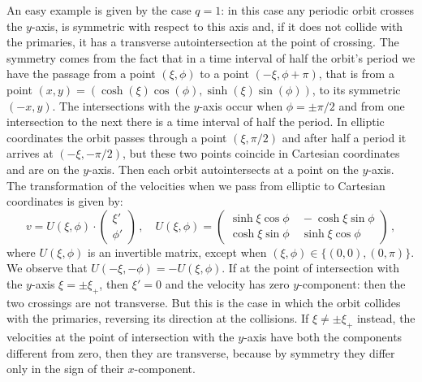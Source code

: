 \documentclass[a4paper]{article}
\begin{document}
An easy example is given by the case $q=1$: in this case any periodic
orbit crosses the $y$-axis, is symmetric with respect to this axis
and, if it does not collide with the primaries, it has a transverse
autointersection at the point of crossing.  The symmetry comes from
the fact that in a time interval of half the orbit's period we have
the passage from a point $(\xi,\phi)$ to a point $(-\xi,\phi +\pi)$,
that is from a point $(x,y)=(\cosh (\xi) \cos (\phi), \sinh (\xi) \sin
(\phi))$, to its symmetric $(-x,y)$.  The intersections with the
$y$-axis occur when $\phi=\pm \pi/2$ and from one intersection to the
next there is a time interval of half the period.  In elliptic
coordinates the orbit passes through a point $(\xi, \pi/2)$ and after
half a period it arrives at $(-\xi,-\pi/2)$, but these two points
coincide in Cartesian coordinates and are on the $y$-axis. Then each
orbit autointersects at a point on the $y$-axis.  The transformation
of the velocities when we pass from elliptic to Cartesian coordinates
is given by:
\begin{equation}
\label{matrixU}
v=U(\xi,\phi) \cdot \left(
\begin{array}{c}
\xi' \\ \phi'
\end{array} \right)\,, \quad
U(\xi,\phi) =
\left(
\begin{array}{cc}
\sinh \xi \cos \phi & \ -\cosh \xi \sin \phi
\\
\cosh \xi \sin \phi &  \ \sinh \xi \cos \phi
\end{array}
\right)\,,
\end{equation}
where $U(\xi,\phi)$ is an invertible matrix, except when $(\xi,\phi)
\in \{(0,0),(0,\pi)\}$.  We observe that $U(-\xi,-\phi)=-U(\xi,\phi)$.
If at the point of intersection with the $y$-axis $\xi = \pm \xi_+$,
then $\xi'=0$ and the velocity has zero $y$-component: then the two
crossings are not transverse.  But this is the case in which the orbit
collides with the primaries, reversing its direction at the
collisions.  If $\xi \neq \pm \xi_+$ instead, the velocities at the
point of intersection with the $y$-axis have both the components
different from zero, then they are transverse, because by symmetry
they differ only in the sign of their $x$-component.
\end{document}
